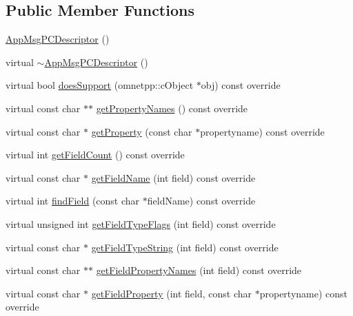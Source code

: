 \subsection*{Public Member Functions}
\begin{DoxyCompactItemize}
\item 
\hyperlink{class_app_msg_p_c_descriptor_a3a331f63d98d56b7433d83ad6afd2fa1}{App\+Msg\+P\+C\+Descriptor} ()
\item 
virtual \hyperlink{class_app_msg_p_c_descriptor_a7928920541dd96935380cd468ee51d5a}{$\sim$\+App\+Msg\+P\+C\+Descriptor} ()
\item 
virtual bool \hyperlink{class_app_msg_p_c_descriptor_a198ed191c1c36b7b177779ab6c36be01}{does\+Support} (omnetpp\+::c\+Object $\ast$obj) const override
\item 
virtual const char $\ast$$\ast$ \hyperlink{class_app_msg_p_c_descriptor_a4e178c3b5f9cca9e86b4e858d3964de7}{get\+Property\+Names} () const override
\item 
virtual const char $\ast$ \hyperlink{class_app_msg_p_c_descriptor_aa3e2e1730d4446da261f56a6c62b8703}{get\+Property} (const char $\ast$propertyname) const override
\item 
virtual int \hyperlink{class_app_msg_p_c_descriptor_a2936e9fbdd28e56c2197380ada446d5e}{get\+Field\+Count} () const override
\item 
virtual const char $\ast$ \hyperlink{class_app_msg_p_c_descriptor_aa147246f0555048fc684ce8bdbf4964f}{get\+Field\+Name} (int field) const override
\item 
virtual int \hyperlink{class_app_msg_p_c_descriptor_a23a276307871f95930bf7f03df3fb178}{find\+Field} (const char $\ast$field\+Name) const override
\item 
virtual unsigned int \hyperlink{class_app_msg_p_c_descriptor_ab112abe6a70f75081cd176586e9ac6d4}{get\+Field\+Type\+Flags} (int field) const override
\item 
virtual const char $\ast$ \hyperlink{class_app_msg_p_c_descriptor_aa5a22389b1a0d2b8e97c936f69a2ed39}{get\+Field\+Type\+String} (int field) const override
\item 
virtual const char $\ast$$\ast$ \hyperlink{class_app_msg_p_c_descriptor_a36f69eac7b710983aa66c647ca0a15c8}{get\+Field\+Property\+Names} (int field) const override
\item 
virtual const char $\ast$ \hyperlink{class_app_msg_p_c_descriptor_a1c141ad9ba88b4113c35424827a46ee9}{get\+Field\+Property} (int field, const char $\ast$propertyname) const override
\item 

\end{DoxyCompactItemize}
